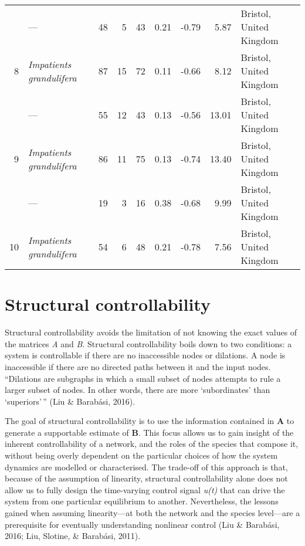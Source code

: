 \documentclass[a4paper]{artikel1}
\theoremstyle{definition}
\theoremstyle{definition}
\theoremstyle{definition}
\theoremstyle{remark}
\begin{document}
\begin{table}
\begin{tabular}[t]{rlrrrrrrl}
\addlinespace
8 & — & 48 & 5 & 43 & 0.21 & -0.79 & 5.87 & Bristol, United Kingdom\\
8 & \textit{Impatients grandulifera} & 87 & 15 & 72 & 0.11 & -0.66 & 8.12 & Bristol, United Kingdom\\
\addlinespace
9 & — & 55 & 12 & 43 & 0.13 & -0.56 & 13.01 & Bristol, United Kingdom\\
9 & \textit{Impatients grandulifera} & 86 & 11 & 75 & 0.13 & -0.74 & 13.40 & Bristol, United Kingdom\\
\addlinespace
10 & — & 19 & 3 & 16 & 0.38 & -0.68 & 9.99 & Bristol, United Kingdom\\
10 & \textit{Impatients grandulifera} & 54 & 6 & 48 & 0.21 & -0.78 & 7.56 & Bristol, United Kingdom\\
\bottomrule
\end{tabular}
\end{table}

\clearpage

\section{Structural controllability}\label{structural-controllability}

Structural controllability avoids the limitation of not knowing the
exact values of the matrices \emph{A} and \emph{B}. Structural
controllability boils down to two conditions: a system is controllable
if there are no inaccessible nodes or dilations. A node is inaccessible
if there are no directed paths between it and the input nodes.
``Dilations are subgraphs in which a small subset of nodes attempts to
rule a larger subset of nodes. In other words, there are more
`subordinates' than `superiors'\,'' (Liu \& Barabási, 2016).

The goal of structural controllability is to use the information
contained in \textbf{A} to generate a supportable estimate of
\textbf{B}. This focus allows us to gain insight of the inherent
controllability of a network, and the roles of the species that compose
it, without being overly dependent on the particular choices of how the
system dynamics are modelled or characterised. The trade-off of this
approach is that, because of the assumption of linearity, structural
controllability alone does not allow us to fully design the time-varying
control signal \emph{u(t)} that can drive the system from one particular
equilibrium to another. Nevertheless, the lessons gained when assuming
linearity---at both the network and the species level---are a
prerequisite for eventually understanding nonlinear control (Liu \&
Barabási, 2016; Liu, Slotine, \& Barabási, 2011).
\end{document}

